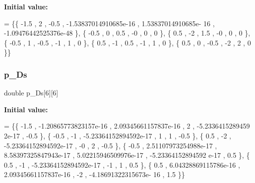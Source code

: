 {\bfseries Initial value\+:}
\begin{DoxyCode}
= \{\{             -1.5 ,                 2 ,              -0.5 , -1.53837014910685e-16 , 1.53837014910685e-
      16 , -1.09476442525376e-48 \},
\{             -0.5 ,                 0 ,               0.5 ,                -0 ,                 0 ,       
                0 \},
\{              0.5 ,                -2 ,               1.5 ,                -0 ,                 0 ,       
                0 \},
\{             -0.5 ,                 1 ,              -0.5 ,                -1 ,                 1 ,       
                0 \},
\{              0.5 ,                -1 ,               0.5 ,                -1 ,                 1 ,       
                0 \},
\{              0.5 ,                 0 ,              -0.5 ,                -2 ,                 2 ,       
                0 \}\}
\end{DoxyCode}
\mbox{\label{a00509_a75dab8f9530af8120d2bf5350308720e}} 
\subsubsection{\texorpdfstring{p\+\_\+\+Ds}{p\_Ds}}
{\footnotesize\ttfamily double p\+\_\+\+Ds\mbox{[}6\mbox{]}\mbox{[}6\mbox{]}}

{\bfseries Initial value\+:}
\begin{DoxyCode}
= \{\{             -1.5 , -1.20865773823157e-16 , 2.09345661157837e-16 ,                 2 , -5.2336415289459
      2e-17 ,              -0.5 \},
\{             -0.5 ,                -1 , -5.23364152894592e-17 ,                 1 ,                 1 ,   
                 -0.5 \},
\{              0.5 ,                -2 , -5.23364152894592e-17 ,                -0 ,                 2 ,   
                 -0.5 \},
\{             -0.5 , 2.51107973254988e-17 , 8.58397325847943e-17 , 5.02215946509976e-17 , -5.23364152894592
      e-17 ,               0.5 \},
\{              0.5 ,                -1 , -5.23364152894592e-17 ,                -1 ,                 1 ,   
                  0.5 \},
\{              0.5 , 6.04328869115786e-16 , 2.09345661157837e-16 ,                -2 , -4.18691322315673e-
      16 ,               1.5 \}\}
\end{DoxyCode}
\mbox{\label{a00509_a473896cbb6a7d08a5a195050cf00d8eb}} 
